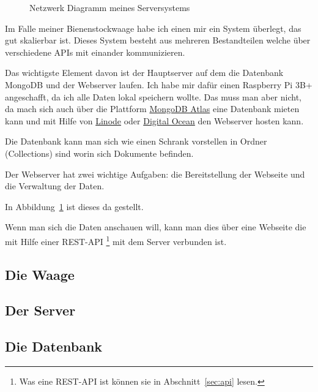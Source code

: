 \documentclass[ngerman,12pt]{scrartcl}
\begin{document}
\begin{figure}[ht]
	\centering
	\caption{Netzwerk Diagramm meines Serversystems\label{abb:networkdiagram}}
\end{figure}

Im Falle meiner Bienenstockwaage habe ich einen mir ein System überlegt, das gut skalierbar ist. 
Dieses System besteht aus mehreren Bestandteilen welche über verschiedene APIs mit einander kommunizieren.

Das wichtigste Element davon ist der Hauptserver auf dem die Datenbank MongoDB und der Webserver laufen.
Ich habe mir dafür einen Raspberry Pi 3B+ angeschafft, da ich alle Daten lokal speichern wollte.
Das muss man aber nicht, da mach sich auch über die Plattform \href{https://www.mongodb.com/cloud/atlas}{MongoDB Atlas} eine Datenbank mieten kann und mit Hilfe von \href{https://www.linode.com}{Linode} oder \href{https://www.digitalocean.com/}{Digital Ocean} den Webserver hosten kann.

Die Datenbank kann man sich wie einen Schrank vorstellen in Ordner (Collections) sind worin sich Dokumente befinden.

Der Webserver hat zwei wichtige Aufgaben:
die Bereitstellung der Webseite und die Verwaltung der Daten.


In Abbildung~\ref{abb:networkdiagram} ist dieses da gestellt.


Wenn man sich die Daten anschauen will, kann man dies über eine Webseite die mit Hilfe einer REST-API
\footnote{Was eine REST-API ist können sie in Abschnitt~\ref{sec:api} lesen.}
mit dem Server verbunden ist.

\subsection{Die Waage}

\subsection{Der Server}

\subsection{Die Datenbank}

\printbibliography{}
\end{document}
